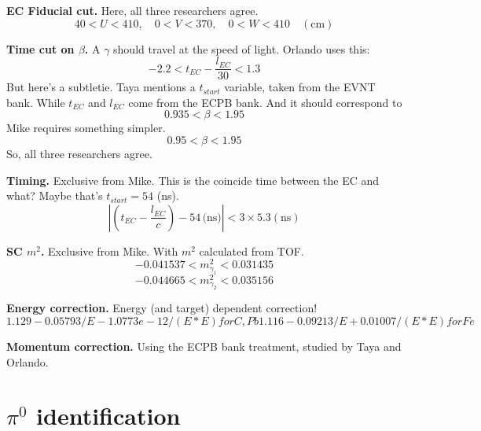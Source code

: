 \textbf{EC Fiducial cut.} Here, all three researchers agree.
\begin{equation}
    40 < U < 410, \quad 0 < V < 370, \quad 0 < W < 410 \quad (\mbox{cm})
\end{equation}

\textbf{Time cut on $\beta$.} A $\gamma$ should travel at the speed of light. Orlando uses this:
\begin{equation}
    -2.2 < t_{EC} - \frac{l_{EC}}{30} < 1.3
\end{equation}
But here's a subtletie. Taya mentions a $t_{start}$ variable, taken from the EVNT bank. While $t_{EC}$ and $l_{EC}$ come from the ECPB bank. And it should correspond to
\begin{equation}
    0.935 < \beta < 1.95
\end{equation}
Mike requires something simpler.
\begin{equation}
    0.95 < \beta < 1.95
\end{equation}
So, all three researchers agree.

\textbf{Timing.} Exclusive from Mike. This is the coincide time between the EC and what? Maybe that's $t_{start} = 54$ (ns).
\begin{equation}
    \left| \left( t_{EC} - \frac{l_{EC}}{c}\right) - 54 \, \mbox{(ns)} \right| < 3 \times 5.3 (\mbox{ns})
\end{equation}

\textbf{SC $m^2$.} Exclusive from Mike. With $m^2$ calculated from TOF.
\begin{equation}
    -0.041537 < m^2_{\gamma_1} < 0.031435
\end{equation}
\begin{equation}
    -0.044665 < m^2_{\gamma_2} < 0.035156
\end{equation}

\textbf{Energy correction.} Energy (and target) dependent correction!
\begin{equation}
    1.129-0.05793/E-1.0773e-12/(E*E) for C, Pb 
    1.116-0.09213/E+0.01007/(E*E) for Fe
\end{equation}

\textbf{Momentum correction.} Using the ECPB bank treatment, studied by Taya and Orlando.

\section{$\pi^0$ identification}

